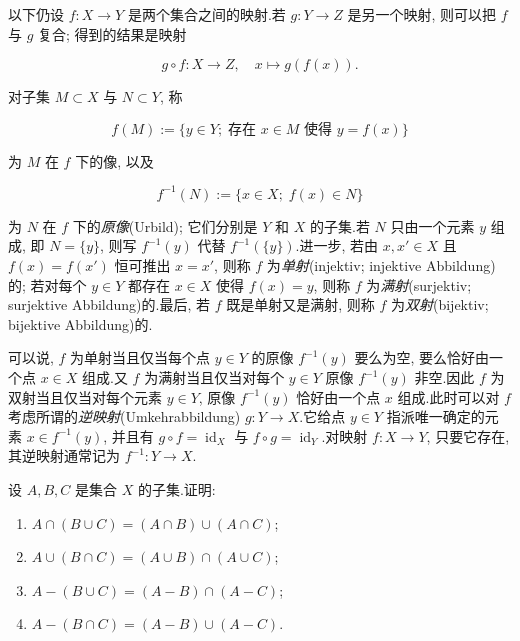 以下仍设 $f \colon X \longrightarrow Y$ 是两个集合之间的映射.若 $g \colon Y \longrightarrow Z$ 是另一个映射, 则可以把 $f$ 与 $g$ 复合; 得到的结果是映射

\[
g \circ f \colon X \longrightarrow Z, \quad x \longmapsto g(f(x)).
\]

对子集 $M \subset X$ 与 $N \subset Y$, 称

\[
f(M) := \{y \in Y;\; \text{存在 } x \in M \text{ 使得 } y = f(x)\}
\]

为 $M$ 在 $f$ 下的像, 以及

\[
f^{-1}(N) := \{x \in X;\; f(x) \in N\}
\]

为 $N$ 在 $f$ 下的\emph{原像}(\textup{Urbild}); 它们分别是 $Y$ 和 $X$ 的子集.若 $N$ 只由一个元素 $y$ 组成, 即 $N = \{y\}$, 则写 $f^{-1}(y)$ 代替 $f^{-1}(\{y\})$.进一步, 若由 $x, x' \in X$ 且 $f(x) = f(x')$ 恒可推出 $x = x'$, 则称 $f$ 为\emph{单射}(\textup{injektiv; injektive Abbildung})的; 若对每个 $y \in Y$ 都存在 $x \in X$ 使得 $f(x) = y$, 则称 $f$ 为\emph{满射}(\textup{surjektiv; surjektive Abbildung})的.最后, 若 $f$ 既是单射又是满射, 则称 $f$ 为\emph{双射}(\textup{bijektiv; bijektive Abbildung})的.

可以说, $f$ 为单射当且仅当每个点 $y \in Y$ 的原像 $f^{-1}(y)$ 要么为空, 要么恰好由一个点 $x \in X$ 组成.又 $f$ 为满射当且仅当对每个 $y \in Y$ 原像 $f^{-1}(y)$ 非空.因此 $f$ 为双射当且仅当对每个元素 $y \in Y$, 原像 $f^{-1}(y)$ 恰好由一个点 $x$ 组成.此时可以对 $f$ 考虑所谓的\emph{逆映射}(\textup{Umkehrabbildung}) $g \colon Y \longrightarrow X$.它给点 $y \in Y$ 指派唯一确定的元素 $x \in f^{-1}(y)$, 并且有 $g \circ f = \operatorname{id}_X$ 与 $f \circ g = \operatorname{id}_Y$.对映射 $f \colon X \longrightarrow Y$, 只要它存在, 其逆映射通常记为 $f^{-1} \colon Y \longrightarrow X$.

\aufgaben

\noindent 设 $A, B, C$ 是集合 $X$ 的子集.证明:
\begin{enumerate}
\item[(i)] $A \cap (B \cup C) = (A \cap B) \cup (A \cap C)$;
\item[(ii)] $A \cup (B \cap C) = (A \cup B) \cap (A \cup C)$;
\item[(iii)] $A - (B \cup C) = (A - B) \cap (A - C)$;
\item[(iv)] $A - (B \cap C) = (A - B) \cup (A - C)$.
\end{enumerate}

